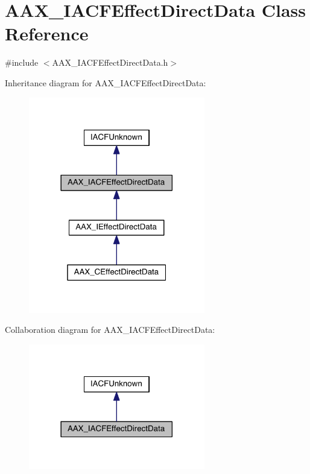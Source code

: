 \hypertarget{a00059}{}\section{A\+A\+X\+\_\+\+I\+A\+C\+F\+Effect\+Direct\+Data Class Reference}
\label{a00059}


{\ttfamily \#include $<$A\+A\+X\+\_\+\+I\+A\+C\+F\+Effect\+Direct\+Data.\+h$>$}



Inheritance diagram for A\+A\+X\+\_\+\+I\+A\+C\+F\+Effect\+Direct\+Data\+:
\nopagebreak
\begin{figure}[H]
\begin{center}
\leavevmode
\includegraphics[width=218pt]{a00520}
\end{center}
\end{figure}


Collaboration diagram for A\+A\+X\+\_\+\+I\+A\+C\+F\+Effect\+Direct\+Data\+:
\nopagebreak
\begin{figure}[H]
\begin{center}
\leavevmode
\includegraphics[width=218pt]{a00521}
\end{center}
\end{figure}


